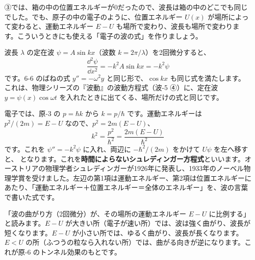 \phkokomade


\label{ph:原-5:sec6}
③では、箱の中の位置エネルギーが0だったので、波長は箱の中のどこでも同じでした。でも、原子の中の電子のように、位置エネルギー $U(x)$ が場所によって変わると、運動エネルギー $E-U$ も場所で変わり、波長も場所で変わります。こういうときにも使える「電子の波の式」を作りましょう。

波長 $\lambda$ の定在波 $\psi=A\sin kx$（波数 $k=2\pi/\lambda$）を2回微分すると、
\[\frac{\dd^2\psi}{\dd x^2}=-k^2A\sin kx=-k^2\psi\]
です。6-6 のばねの式 $y''=-\omega^2y$ と同じ形で、$\cos kx$ も同じ式を満たします。これは、物理シリーズの『波動』の波動方程式（波-5 ④）に、定在波 $y=\psi(x)\cos\omega t$ を入れたときに出てくる、場所だけの式と同じです。

電子では、原-3 の $p=\hbar k$ から $k=p/\hbar$ です。運動エネルギーは $p^2/(2m)=E-U$ なので、$p^2=2m(E-U)$、
\[k^2=\frac{p^2}{\hbar^2}=\frac{2m(E-U)}{\hbar^2}\]
です。これを $\psi''=-k^2\psi$ に入れ、両辺に $-\hbar^2/(2m)$ をかけて $U\psi$ を左へ移すと、
\label{ph:原-5:schr}となります。これを\textbf{時間によらないシュレディンガー方程式}といいます。オーストリアの物理学者シュレディンガーが1926年に発表し、1933年のノーベル物理学賞を受けました。左辺の第1項は運動エネルギー、第2項は位置エネルギーにあたり、「運動エネルギー＋位置エネルギー＝全体のエネルギー」を、波の言葉で書いた式です。

\begin{phyomi}[$-\dfrac{\hbar^2}{2m}\psi''+U\psi=E\psi$]
「波の曲がり方（2回微分）が、その場所の運動エネルギー $E-U$ に比例する」と読みます。$E-U$ が大きい所（電子が速い所）では、波は強く曲がり、波長が短くなります。$E-U$ が小さい所では、ゆるく曲がり、波長が長くなります。$E<U$ の所（ふつうの粒なら入れない所）では、曲がる向きが逆になります。これが原-6 のトンネル効果のもとです。
\end{phyomi}

